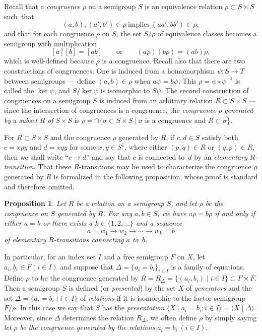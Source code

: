 \documentclass{surv-l}
\numberwithin{equation}{section}
\numberwithin{table}{section}
\numberwithin{figure}{section}
\theoremstyle{plain}
\newtheorem{proposition}[equation]{Proposition}
\theoremstyle{definition}
\begin{document}
Recall that a \emph{congruence} $\rho$ on a
semigroup $S$ is an equivalence relation $\rho\subset S\times S$
such~that
\[
(a, b), (a', b')\in\rho\ \mathrm{implies}\ (aa', bb')\in\rho,
\]
and that for each congruence $\rho$ on $S$, the set $S/\rho$ of
equivalence classes becomes a semigroup with multiplication
\[
[a][b]=[ab]\qquad \mathrm{or}\qquad (a\rho)(b\rho)=(ab)\rho,
\]
which is well-defined because $\rho$ is a congruence. Recall also
that there are two constructions of
congruences: One is induced from a homomorphism
$\psi : S\rightarrow T$ between semigroups
--- define $(a,b)\in\rho$ when $a\psi=b\psi$. This $\rho=\psi
\circ \psi^{-1}$ is called the $\ker \psi$, and
$S/\ker \psi$ is isomorphic to $S\psi$. The second
construction of congruences on a semigroup $S$ is induced from an
arbitrary relation $R\subset S \times S$ --- since the
intersection of congruences is a congruence, the \emph{congruence}
$\rho$ \emph{generated by} a
\emph{subset} $R$ \emph{of} $S\times S$ is
$\rho=\cap\{\sigma\subset S\times S\mid \sigma$ is a
congruence and $R\subset\sigma$\}.

For $R\subset S\times S$ and the congruence $\rho$
generated by $R$, if $c, d\in S$ satisfy both $c=xpy$ and
$d=xqy$ for some $x, y\in S^{1}$, where either $(p, q)\in R$ or
$(q,p)\in R$, then we shall write ``$c\rightarrow d$'' and say
that $c$ is connected to~$d$ by an \emph{elementary}
$R$-\emph{transition}. That these $R$-transitions may be used to
characterize the congruence $\rho$ generated by $R$ is formalized
in the following proposition, whose proof is standard and
therefore~omitted.

\setcounter{equation}{2}
\begin{proposition}\label{prop9.42.3}
Let $R$ be a relation on a semigroup $S$, and let $\rho$ be the
congruence on $S$ generated by $R$. For any $a, b\in S$, we have
$a\rho=b\rho$ if and only if either $a=b$ or there exists a
$k\in\{1,2,\ldots\}$ and a sequence
\[
a=w_{1}\rightarrow w_{2}\rightarrow\cdots\rightarrow w_{k}=b
\]
of elementary $R$-transitions
connecting $a$ to~$b$.
\end{proposition}

In particular, for an index set $I$ and a free semigroup $F$ on
$X$, let $a_{i}, b_{i}\in F (i\in I)$ and suppose that
$\Delta=\{a_{i}=b_{i}\}_{i\in I}$ is a family of equations.
Define $\rho$ to be the congruence generated by
$R=R_{\Delta}=\{(a_{i}, b_{i})\mid i\in I\} \subset F\times
F$. Then a semigroup $S$ is defined (or
\emph{presented}) by the set $X$ of
\emph{generators} and the set $\Delta=\{a_{i}=b_{i}\mid i\in I\}$
of \emph{relations} if it is isomorphic to the
factor semigroup $F/\rho$. In this case we say that $S$ has the
\emph{presentation} $\langle X \mid a_{i}=
b_{i};i\in I \rangle=\langle X\mid \Delta\rangle$.
Moreover, since $\Delta$ determines the relation
$R_{\Delta}$, we often define $\rho$ by simply saying
\emph{let} $\rho$ \emph{be the congruence generated by the
relations} $a_{i}=b_{i}\ (i\in I)$.
\end{document}
